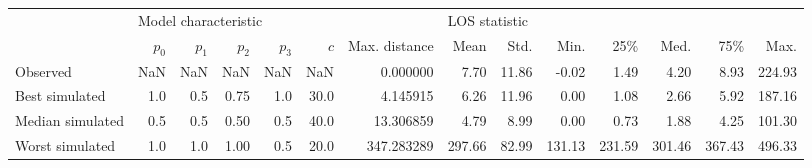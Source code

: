 \begin{tabular}{lrrrrrrrrrrrrr}
\toprule
{} & \multicolumn{6}{l}{Model characteristic} & \multicolumn{7}{l}{LOS statistic} \\
{} &              \(p_0\) & \(p_1\) & \(p_2\) & \(p_3\) & \(c\) & Max. distance &          Mean &   Std. &    Min. &     25\% &    Med. &     75\% &    Max. \\
\midrule
Observed         &                  NaN &     NaN &     NaN &     NaN &   NaN &      0.000000 &          7.70 &  11.86 &   -0.02 &    1.49 &    4.20 &    8.93 &  224.93 \\
Best simulated   &                  1.0 &     0.5 &    0.75 &     1.0 &  30.0 &      4.145915 &          6.26 &  11.96 &    0.00 &    1.08 &    2.66 &    5.92 &  187.16 \\
Median simulated &                  0.5 &     0.5 &    0.50 &     0.5 &  40.0 &     13.306859 &          4.79 &   8.99 &    0.00 &    0.73 &    1.88 &    4.25 &  101.30 \\
Worst simulated  &                  1.0 &     1.0 &    1.00 &     0.5 &  20.0 &    347.283289 &        297.66 &  82.99 &  131.13 &  231.59 &  301.46 &  367.43 &  496.33 \\
\bottomrule
\end{tabular}
